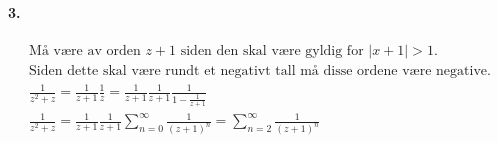 \documentclass[11pt, A4paper,norsk]{article}
\begin{document}
		\paragraph{3.}
			\begin{gather*}
\text{Må være av orden $z + 1$ siden den skal være gyldig for $|x + 1| > 1$.} \\ \text{Siden dette skal være rundt et negativt tall må disse ordene være negative.} \\
\frac{1}{z^2 + z} = \frac{1}{z + 1} \frac{1}{z} = \frac{1}{z + 1} \frac{1}{z + 1} \frac{1}{1 - \frac{1}{z + 1}} \\
\frac{1}{z^2 + z} = \frac{1}{z + 1} \frac{1}{z + 1} \sum_{n = 0}^{\infty} \frac{1}{(z + 1)^n}  = \sum_{n = 2}^{\infty} \frac{1}{(z + 1)^n} \\
			\end{gather*}
\end{document}
